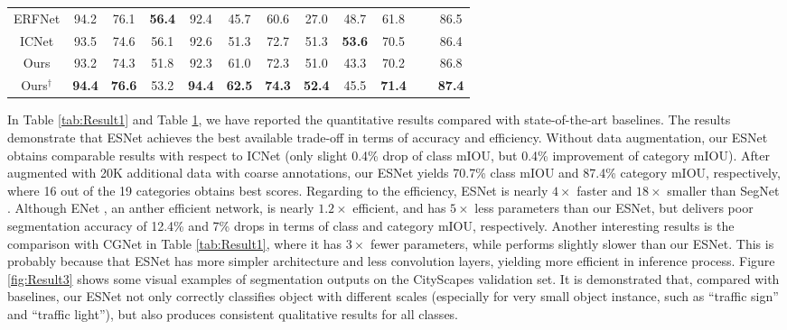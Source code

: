 \documentclass[runningheads]{llncs}
\begin{document}
\begin{table}[!t]
\begin{center}
\begin{tabular}{|c|cccccccccc|c|}
ERFNet \cite{Romera2018erfnet}         &94.2 &76.1 &\textbf{56.4} &92.4 &45.7 &60.6 &27.0 &48.7 &61.8 &~ &86.5\\
ICNet \cite{Zhao2018ICnet}             &93.5 &74.6 &56.1 &92.6 &51.3 &72.7 &51.3 &\textbf{53.6} &70.5 &~ &86.4\\
\hline
Ours                                   &93.2 &74.3 &51.8 &92.3 &61.0 &72.3 &51.0 &43.3 &70.2 &~ &86.8\\
Ours$^{\dag}$                          &\textbf{94.4} &\textbf{76.6} &53.2 &\textbf{94.4} &\textbf{62.5} &\textbf{74.3} &\textbf{52.4} &45.5 &\textbf{71.4} &~ &\textbf{87.4}\\
\hline
\end{tabular}
\end{center}\label{tab:Result2}
\end{table}

In Table \ref{tab:Result1} and Table \ref{tab:Result2}, we have reported the quantitative results compared with state-of-the-art baselines. The results demonstrate that ESNet achieves the best available trade-off in terms of accuracy and efficiency. Without data augmentation, our ESNet obtains comparable results with respect to ICNet \cite{Zhao2018ICnet} (only slight 0.4\% drop of class mIOU, but 0.4\% improvement of category mIOU). After augmented with 20K additional data with coarse annotations, our ESNet yields 70.7\% class mIOU and 87.4\% category mIOU, respectively, where 16 out of the 19 categories obtains best scores. Regarding to the efficiency, ESNet is nearly $4 \times$ faster and $18 \times$ smaller than SegNet \cite{Badrinarayanan2015Segnet}. Although ENet \cite{Paszke2016enet}, an anther efficient network, is nearly $1.2 \times$ efficient, and has $5 \times$ less parameters than our ESNet, but delivers poor segmentation accuracy of 12.4\% and 7\% drops in terms of class and category mIOU, respectively. Another interesting results is the comparison with CGNet \cite{wu2018cgnet} in Table \ref{tab:Result1}, where it has $3 \times$ fewer parameters, while performs slightly slower than our ESNet. This is probably because that ESNet has more simpler architecture and less convolution layers, yielding more efficient in inference process. Figure \ref{fig:Result3} shows some visual examples of segmentation outputs on the CityScapes validation set. It is demonstrated that, compared with baselines, our ESNet not only correctly classifies object with different scales (especially for very small object instance, such as ``traffic sign'' and ``traffic light''), but also produces consistent qualitative results for all classes.
\end{document}
